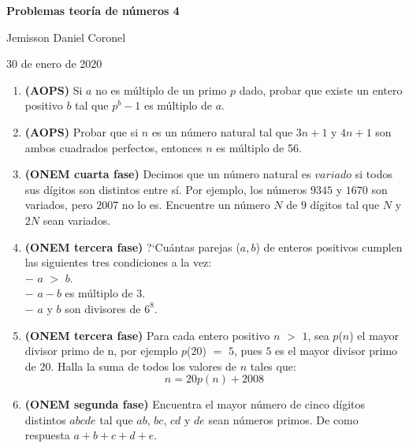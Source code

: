 \documentclass[10pt,a4 paper]{article}
\begin{document}
\chead{}

\begin{center}
\textbf{\Large{Problemas teor\'ia de n\'umeros 4}}
\end{center}

\begin{center}
Jemisson Daniel Coronel
\end{center}

\begin{center}
30 de enero de 2020
\end{center}
\vspace{9mm}
\begin{enumerate}

\item \textbf{(AOPS)} Si $a$ no es m\'ultiplo de un primo $p$ dado, probar que existe un entero positivo $b$ tal que $p^{b} - 1$ es m\'ultiplo de $a$. 

\item \textbf{(AOPS)} Probar que si $n$ es un n\'umero natural tal que $3n + 1$ y $4n + 1$ son ambos cuadrados perfectos, entonces $n$ es m\'ultiplo de 56. 

\item \textbf{(ONEM cuarta fase)} Decimos que un n\'umero natural es $variado$ si todos sus d\'igitos son distintos entre s\'i. Por ejemplo, los n\'umeros $9345$ y $1670$ son variados, pero $2007$ no lo es. Encuentre un n\'umero $N$ de $9$ d\'igitos tal que $N$ y $2N$ sean variados.   

\item \textbf{(ONEM tercera fase)} ?`Cu\'antas parejas ($a, b$) de enteros positivos cumplen las siguientes tres condiciones a la vez: \\
$-$ $a$ $>$ $b$. \\
$-$ $a - b$ es m\'ultiplo de 3. \\
$-$ $a$ y $b$ son divisores de $6^{8}$.

\item \textbf{(ONEM tercera fase)} Para cada entero positivo $n$ $>$ $1$, sea $p$($n$) el mayor divisor primo de n, por ejemplo $p$($20$) $=$ $5$, pues $5$ es el mayor divisor primo de $20$. Halla la suma de todos los valores de $n$ tales que:
$$n = 20p(n) + 2008$$

\item \textbf{(ONEM segunda fase)} Encuentra el mayor n\'umero de cinco d\'igitos distintos $abcde$ tal que $ab$, $bc$, $cd$ y $de$ sean n\'umeros primos. De como respuesta $a + b + c + d + e$. 


\end{enumerate}
\end{document}
